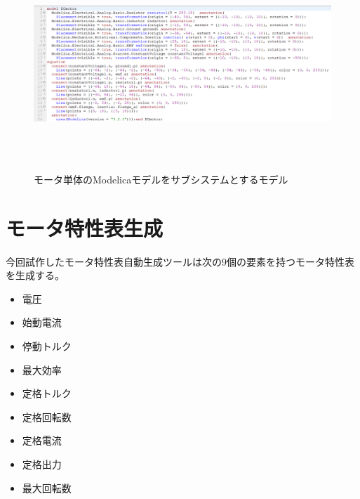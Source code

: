 \begin{figure}[t]
	\centering
	\includegraphics[width=16.5cm,height=8cm]{./Image/tantai_modelica.png}
	\caption{モータ単体のModelicaモデルをサブシステムとするモデル}
	\label{fig:subsisu_modelica}
  \end{figure}


\section{モータ特性表生成}\label{kenkyu_mokuteki}
今回試作したモータ特性表自動生成ツールは次の9個の要素を持つモータ特性表を生成する。

\begin{itemize}
	\item 電圧
	\item 始動電流
	\item 停動トルク
	\item 最大効率
	\item 定格トルク
	\item 定格回転数
	\item 定格電流
	\item 定格出力
	\item 最大回転数 
\end{itemize}

